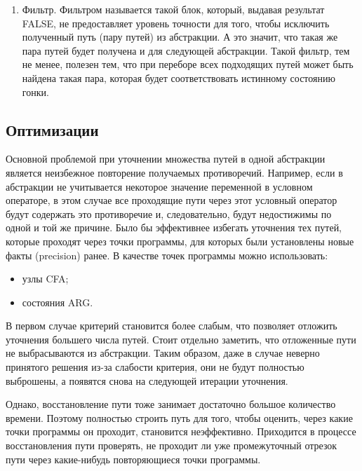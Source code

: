 \begin{enumerate}
\item Фильтр. Фильтром называется такой блок, который, выдавая результат FALSE, не предоставляет уровень точности для того, чтобы исключить полученный путь (пару путей) из абстракции.
А это значит, что такая же пара путей будет получена и для следующей абстракции.
Такой фильтр, тем не менее, полезен тем, что при переборе всех подходящих путей может быть найдена такая пара, которая будет соответствовать истинному состоянию гонки.

\end{enumerate}

\subsection{Оптимизации}

Основной проблемой при уточнении множества путей в одной абстракции является неизбежное повторение получаемых противоречий.
Например, если в абстракции не учитывается некоторое значение переменной в условном операторе, в этом случае все проходящие пути через этот условный оператор будут содержать это противоречие и, следовательно, будут недостижимы по одной и той же причине.
Было бы эффективнее избегать уточнения тех путей, которые проходят через точки программы, для которых были установлены новые факты (precision) ранее.
В качестве точек программы можно использовать:

\begin{itemize}
\item узлы CFA;
\item состояния ARG.
\end{itemize}

В первом случае критерий становится более слабым, что позволяет отложить уточнения большего числа путей.
Стоит отдельно заметить, что отложенные пути не выбрасываются из абстракции.
Таким образом, даже в случае неверно принятого решения из-за слабости критерия, они не будут полностью выброшены, а появятся снова на следующей итерации уточнения.

Однако, восстановление пути тоже занимает достаточно большое количество времени.
Поэтому полностью строить путь для того, чтобы оценить, через какие точки программы он проходит, становится неэффективно.
Приходится в процессе восстановления пути проверять, не проходит ли уже промежуточный отрезок пути через какие-нибудь повторяющиеся точки программы.

